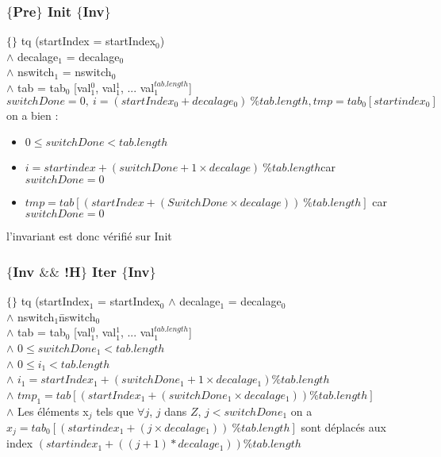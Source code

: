 \subsubsection*{$\{$Pre$\}$ Init $\{$Inv$\}$}

$\{\}$ tq (startIndex = startIndex$_{0}$) \\
$\wedge$ decalage$_{1}$ = decalage$_{0}$\\
$\wedge$ nswitch$_{1}$ = nswitch$_{0}$\\
$\wedge$ tab = tab$_{0}$ [val$_{1}^{0}$, val$_{1}^{1}$, ... val$_{1}^{tab.length}$]\\


{$switchDone = 0,\ i = (startIndex_0 + decalage_0)\ \% tab.length, tmp = tab_0[startindex_0]$}\\
on a bien : 
\begin{itemize}
	\item $0\leq switchDone < tab.length$
	\item $i = startindex + (switchDone+1\times decalage)\ \% tab.length $car$ switchDone = 0$
	\item $tmp = tab[(startIndex + (SwitchDone\times decalage))\ \% tab.length]$ car $switchDone = 0$
\end{itemize}
l'invariant est donc vérifié sur Init

\subsubsection*{$\{$Inv $\&\&$ !H$\}$ Iter $\{$Inv$\}$}

$\{\}$ tq (startIndex$_{1}$ = startIndex$_{0}$
$\wedge$ decalage$_{1}$ = decalage$_{0}$\\
$\wedge$ nswitch$_{1}$\= nswitch$_{0}$\\
$\wedge$ tab = tab$_{0}$ [val$_{1}^{0}$, val$_{1}^{1}$, ... val$_{1}^{tab.length}$]\\
$\wedge$ $0\leq switchDone_{1} < tab.length$\\
$\wedge$ $0\leq i_{1} < tab.length$\\
$\wedge$ $i_{1} = startIndex_{1} + (switchDone_{1}+1\times decalage_{1}) \% tab.length$\\
$\wedge$ $tmp_{1} = tab[(startIndex_{1} + (switchDone_{1}\times decalage_{1}))  \% tab.length]$\\
$\wedge$ Les éléments x$_{j}$ tels que $\forall j$, $j$ dans $Z$, $j<switchDone_{1}$ on a $x_{j}=tab_{0}[(startindex_{1} + (j\times decalage_{1}))\ \% tab.length]$ sont déplacés aux index $(startindex_{1} + ((j+1)* decalage_{1}))\%tab.length$\\

